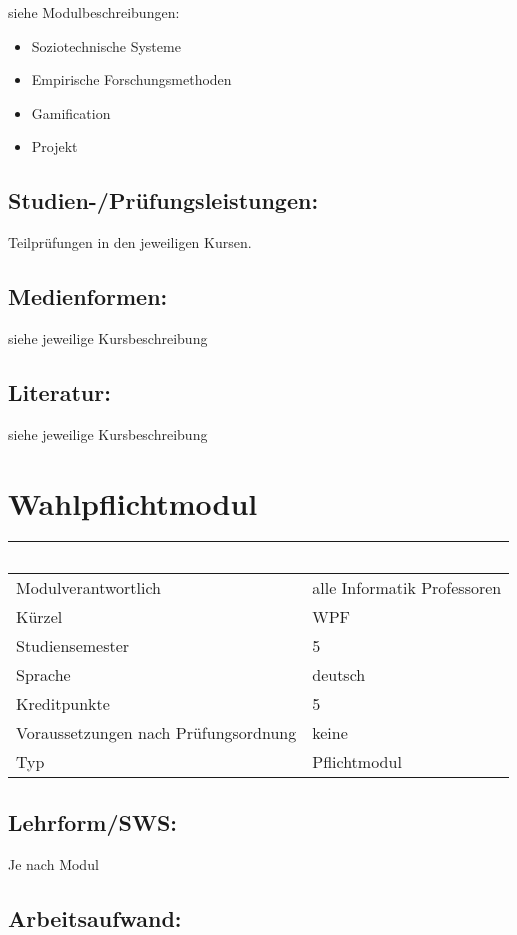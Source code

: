 siehe Modulbeschreibungen:

\begin{itemize}
\item
  Soziotechnische Systeme
\item
  Empirische Forschungsmethoden
\item
  Gamification
\item
  Projekt
\end{itemize}

\section*{Studien-/Prüfungsleistungen:}\label{studien-pruxfcfungsleistungen-25}

Teilprüfungen in den jeweiligen Kursen.

\section*{Medienformen:}\label{medienformen-18}

siehe jeweilige Kursbeschreibung

\section*{Literatur:}\label{literatur-23}

siehe jeweilige Kursbeschreibung

\chapter{Wahlpflichtmodul}\label{wahlpflichtmodul}

\begin{longtable}[]{@{}ll@{}}
\toprule
~ & ~\tabularnewline
\midrule
\endhead
Modulverantwortlich & alle Informatik Professoren\tabularnewline
Kürzel & WPF\tabularnewline
Studiensemester & 5\tabularnewline
Sprache & deutsch\tabularnewline
Kreditpunkte & 5\tabularnewline
Voraussetzungen nach Prüfungsordnung & keine\tabularnewline
Typ & Pflichtmodul\tabularnewline
\bottomrule
\end{longtable}

\section*{Lehrform/SWS:}\label{lehrformsws-28}

Je nach Modul

\section*{Arbeitsaufwand:}\label{arbeitsaufwand-27}

